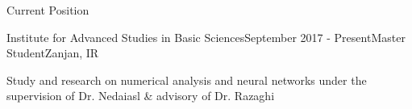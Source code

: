 \begin{rSection}{Current Position}
	\begin{rSubsection}{Institute for Advanced Studies in Basic Sciences}{September 2017 - Present}{Master Student}{Zanjan, IR}
		\item Study and research on numerical analysis and neural networks under the supervision of Dr. Nedaiasl \& advisory of Dr. Razaghi
	\end{rSubsection}	
\end{rSection}